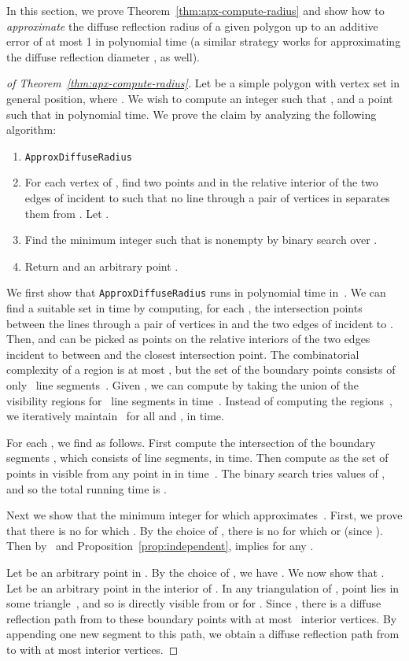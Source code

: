 \documentclass[12pt]{article}
\begin{document}
In this section, we prove Theorem~\ref{thm:apx-compute-radius} and show how to \emph{approximate} the diffuse reflection radius  of a given polygon  up to an additive error of at most 1 in polynomial time (a similar strategy works for approximating the diffuse reflection diameter , as well).

\begin{proof}[of Theorem~\ref{thm:apx-compute-radius}]
Let  be a simple polygon with vertex set  in general position, where .
We wish to compute an integer  such that ,
and a point  such that  in polynomial time.
We prove the claim by analyzing the following algorithm:
\begin{enumerate} \itemsep2pt
\item[]\texttt{ApproxDiffuseRadius}
  \item For each vertex  of , find two points  and  in the relative interior of the two edges of  incident to  such that no line through a pair of vertices in
        separates them from . Let .
  \item Find the minimum integer  such that 
       is nonempty by binary search over .
\item Return  and an arbitrary point .
\end{enumerate}

We first show that \texttt{ApproxDiffuseRadius} runs in polynomial time in~.
We can find a suitable set  in  time by computing, for each ,
the intersection points between the  lines through a pair of vertices in  and
the two edges of  incident to .
Then,  and  can be picked as points on the relative interiors of the two edges incident
to  between  and the closest intersection point.
The combinatorial complexity of a region 
is at most , but the set of the boundary points  consists
of only~ line segments~\cite{ADI+06}.  Given ,
we can compute  by taking the union of the visibility regions
for~ line segments in  time~\cite{BLM02,CW12}. Instead of computing the
regions~, we iteratively maintain~ for all
 and , in  time.

For each , we find  as follows.
First compute the intersection of the boundary segments
, which consists of 
line segments, in  time. Then compute  as the set of points in 
visible from any point in  in  time~\cite{ADI+06}. The binary search
tries  values of , and so the total running time is .

Next we show that the minimum integer  for which  approximates~.
First, we prove that there is no  for which .
By the choice of , there is no  for which  or  (since ).
Then by~\cite{Us} and Proposition~\ref{prop:independent},  implies  for any .

Let  be an arbitrary point in . By the choice of , we have
. We now show that .
Let  be an arbitrary point in the interior of .
In any triangulation of , point  lies in some triangle~, and so  is directly visible from
 or  for . Since ,
there is a diffuse reflection path from  to these boundary points
with at most~ interior vertices. By appending one new segment to this
path, we obtain a diffuse reflection path from  to  with at most
 interior vertices.
\end{proof}
\end{document}
